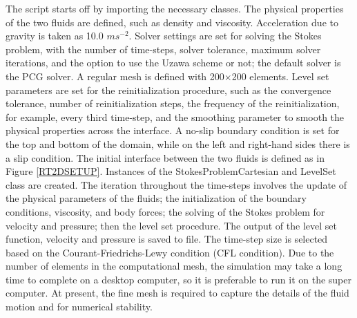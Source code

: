 The script starts off by importing the necessary classes. The physical properties of the two fluids are defined, such as density and viscosity.
Acceleration due to gravity is taken as 10.0 $ms^{-2}$.
Solver settings are set for solving the Stokes problem, with the number of time-steps, solver tolerance, maximum solver iterations,
and the option to use the Uzawa scheme or not; the default solver is the PCG solver. A regular mesh is defined with 200$\times$200 elements. 
Level set parameters are set for the reinitialization procedure, such as the convergence tolerance, number of 
reinitialization steps, the frequency of the reinitialization, for example, every third time-step, and the smoothing
 parameter to smooth the physical properties across the interface.
 A no-slip boundary condition is set for the top and bottom of the domain, while on the left and right-hand sides
 there is a slip condition. 
The initial interface between the two fluids is defined as in Figure \ref{RT2DSETUP}. Instances of the StokesProblemCartesian and LevelSet class are created. 
The iteration throughout the time-steps involves the update of the physical parameters of the fluids; the initialization of 
the boundary conditions, viscosity, and body forces; the solving of the Stokes problem for velocity and pressure; then the 
level set procedure. 
The output of the level set function, velocity and pressure is saved to file. 
The time-step size is selected based on the Courant-Friedrichs-Lewy condition (CFL condition). 
Due to the number of elements in the computational mesh, the simulation may take a long time to complete on a desktop computer, 
so it is preferable to run it on the super computer. 
At present, the fine mesh is required to capture the details of the fluid motion and for numerical stability.  
%
